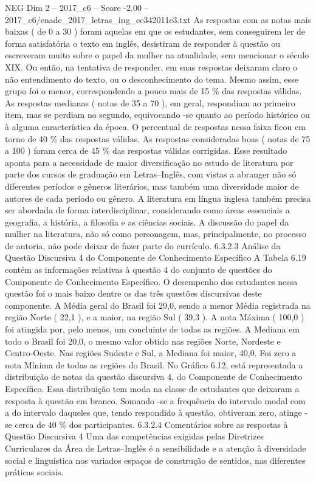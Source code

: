 \begin{textsample}{NEG Dim 2 – 2017\_c6 – Score -2.00 – 2017\_c6/enade\_2017\_letras\_ing\_ee342011e3.txt}
As respostas com as notas mais baixas ( de 0 a 30 ) foram aquelas em que os estudantes, sem conseguirem ler de forma satisfatória o texto em inglês, desistiram de responder à questão ou escreveram muito sobre o papel da mulher na atualidade, sem mencionar o século XIX.
Ou então, na tentativa de responder, em suas respostas deixaram claro o não entendimento do texto, ou o desconhecimento do tema.
Mesmo assim, esse grupo foi o menor, correspondendo a pouco mais de 15 \% das respostas válidas.
As respostas medianas ( notas de 35 a 70 ), em geral, respondiam ao primeiro item, mas se perdiam no segundo, equivocando -se quanto ao período histórico ou à alguma característica da época.
O percentual de respostas nessa faixa ficou em torno de 40 \% das respostas válidas.
As respostas consideradas boas ( notas de 75 a 100 ) foram cerca de 45 \% das respostas válidas corrigidas.
Esse resultado aponta para a necessidade de maior diversificação no estudo de literatura por parte dos cursos de graduação em Letras–Inglês, com vistas a abranger não só diferentes períodos e gêneros literários, mas também uma diversidade maior de autores de cada período ou gênero.
A literatura em língua inglesa também precisa ser abordada de forma interdisciplinar, considerando como áreas essenciais a geografia, a história, a filosofia e as ciências sociais.
A discussão do papel da mulher na literatura, não só como personagem, mas, principalmente, no processo de autoria, não pode deixar de fazer parte do currículo. 6.3.2.3 Análise da Questão Discursiva 4 do Componente de Conhecimento Específico A Tabela 6.19 contém as informações relativas à questão 4 do conjunto de questões do Componente de Conhecimento Específico.
O desempenho dos estudantes nessa questão foi o mais baixo dentre os das três questões discursivas deste componente.
A Média geral do Brasil foi 29,0, sendo a menor Média registrada na região Norte ( 22,1 ), e a maior, na região Sul ( 39,3 ).
A nota Máxima ( 100,0 ) foi atingida por, pelo menos, um concluinte de todas as regiões.
A Mediana em todo o Brasil foi 20,0, o mesmo valor obtido nas regiões Norte, Nordeste e Centro-Oeste.
Nas regiões Sudeste e Sul, a Mediana foi maior, 40,0.
Foi zero a nota Mínima de todas as regiões do Brasil.
No Gráfico 6.12, está representada a distribuição de notas da questão discursiva 4, do Componente de Conhecimento Específico.
Essa distribuição tem moda na classe de estudantes que deixaram a resposta à questão em branco.
Somando -se a frequência do intervalo modal com a do intervalo daqueles que, tendo respondido à questão, obtiveram zero, atinge -se cerca de 40 \% dos participantes. 6.3.2.4 Comentários sobre as respostas à Questão Discursiva 4 Uma das competências exigidas pelas Diretrizes Curriculares da Área de Letras–Inglês é a sensibilidade e a atenção à diversidade social e linguística nos variados espaços de construção de sentidos, nas diferentes práticas sociais.

\end{textsample}
